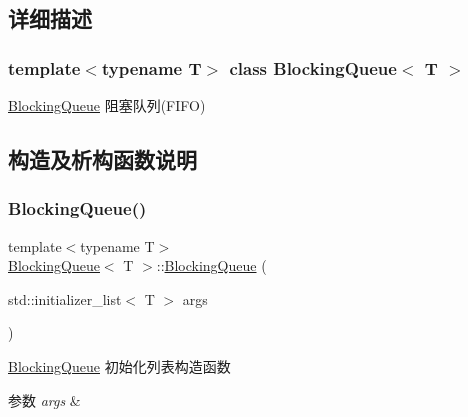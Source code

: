 \subsection{详细描述}
\subsubsection*{template$<$typename T$>$\newline
class Blocking\+Queue$<$ T $>$}

\hyperlink{classBlockingQueue}{Blocking\+Queue} 阻塞队列(\+F\+I\+F\+O) 

\subsection{构造及析构函数说明}
\mbox{\label{classBlockingQueue_a4d1bbabd0a1212ab77b3a24614b6b0c1}} 
\subsubsection{\texorpdfstring{Blocking\+Queue()}{BlockingQueue()}\hspace{0.1cm}{\footnotesize\ttfamily [1/3]}}
{\footnotesize\ttfamily template$<$typename T$>$ \\
\hyperlink{classBlockingQueue}{Blocking\+Queue}$<$ T $>$\+::\hyperlink{classBlockingQueue}{Blocking\+Queue} (\begin{DoxyParamCaption}\item[{std\+::initializer\+\_\+list$<$ T $>$}]{args }\end{DoxyParamCaption})\hspace{0.3cm}{\ttfamily [inline]}}



\hyperlink{classBlockingQueue}{Blocking\+Queue} 初始化列表构造函数 


\begin{DoxyParams}{参数}
{\em args} & \\
\hline
\end{DoxyParams}
\mbox{\label{classBlockingQueue_a2f2b1e4d887d77a81fddabd44c5cdbfd}} 
